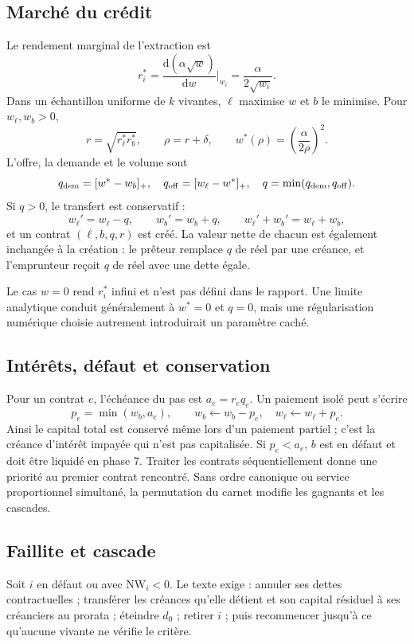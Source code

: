 \documentclass[11pt,a4paper]{article}
\newcommand{\NW}{\mathrm{NW}}
\newcommand{\dd}{\mathrm{d}}
\begin{document}
\subsection{Marché du crédit}

Le rendement marginal de l'extraction est
\[
 r_i^*=\frac{\dd(\alpha\sqrt w)}{\dd w}\bigg|_{w_i}
      =\frac{\alpha}{2\sqrt{w_i}}.
\]
Dans un échantillon uniforme de $k$ vivantes, $\ell$ maximise $w$ et $b$ le
minimise. Pour $w_\ell,w_b>0$,
\[
 r=\sqrt{r_\ell^*r_b^*},\qquad \rho=r+\delta,
 \qquad w^*(\rho)=\left(\frac{\alpha}{2\rho}\right)^2.
\]
L'offre, la demande et le volume sont
\[
 q_{\rm dem}=[w^*-w_b]_+,
 \quad q_{\rm off}=[w_\ell-w^*]_+,
 \quad q=\min(q_{\rm dem},q_{\rm off}).
\]
Si $q>0$, le transfert est conservatif :
\[
 w_\ell' = w_\ell-q,\qquad w_b'=w_b+q,
 \qquad w_\ell'+w_b'=w_\ell+w_b,
\]
et un contrat $(\ell,b,q,r)$ est créé. La valeur nette de chacun est également
inchangée à la création : le prêteur remplace $q$ de réel par une créance, et
l'emprunteur reçoit $q$ de réel avec une dette égale.

Le cas $w=0$ rend $r_i^*$ infini et n'est pas défini dans le rapport. Une limite
analytique conduit généralement à $w^*=0$ et $q=0$, mais une régularisation
numérique choisie autrement introduirait un paramètre caché.

\subsection{Intérêts, défaut et conservation}

Pour un contrat $e$, l'échéance du pas est $a_e=r_eq_e$. Un paiement isolé peut
s'écrire
\[
 p_e=\min(w_b,a_e),\qquad
 w_b\leftarrow w_b-p_e,\quad w_\ell\leftarrow w_\ell+p_e.
\]
Ainsi le capital total est conservé même lors d'un paiement partiel ; c'est la
créance d'intérêt impayée qui n'est pas capitalisée. Si $p_e<a_e$, $b$ est en
défaut et doit être liquidé en phase 7. Traiter les contrats séquentiellement
donne une priorité au premier contrat rencontré. Sans ordre canonique ou service
proportionnel simultané, la permutation du carnet modifie les gagnants et les
cascades.

\subsection{Faillite et cascade}

Soit $i$ en défaut ou avec $\NW_i<0$. Le texte exige : annuler ses dettes
contractuelles ; transférer les créances qu'elle détient et son capital résiduel
à ses créanciers au prorata ; éteindre $d_0$ ; retirer $i$ ; puis recommencer
jusqu'à ce qu'aucune vivante ne vérifie le critère.
\end{document}
